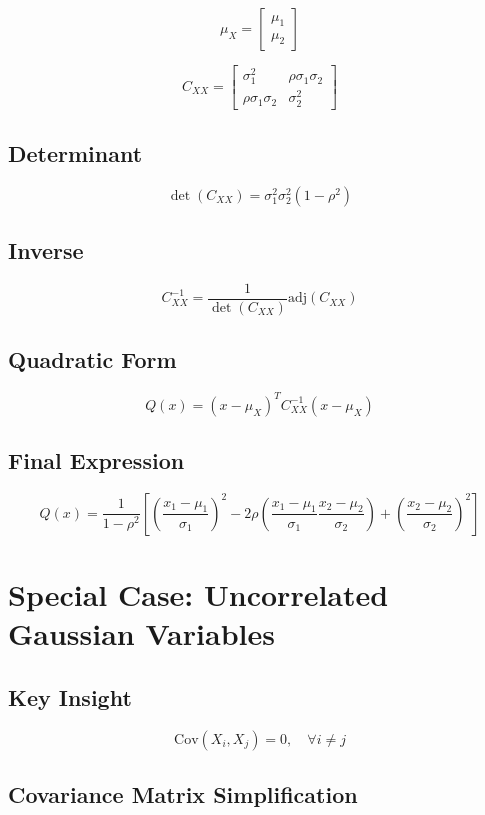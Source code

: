 \documentclass[12pt]{article}
\begin{document}
\[
\mu_X =
\begin{bmatrix}
\mu_1 \\
\mu_2
\end{bmatrix}
\]

\[
C_{XX} =
\begin{bmatrix}
\sigma_1^2 & \rho\sigma_1\sigma_2 \\
\rho\sigma_1\sigma_2 & \sigma_2^2
\end{bmatrix}
\]

\subsection{Determinant}

\[
\det(C_{XX}) = \sigma_1^2 \sigma_2^2 (1 - \rho^2)
\]

\subsection{Inverse}

\[
C_{XX}^{-1} = \frac{1}{\det(C_{XX})} \text{adj}(C_{XX})
\]

\subsection{Quadratic Form}

\[
Q(x) = (x - \mu_X)^T C_{XX}^{-1}(x - \mu_X)
\]

\subsection{Final Expression}

\[
Q(x) =
\frac{1}{1-\rho^2}
\left[
\left(\frac{x_1-\mu_1}{\sigma_1}\right)^2
-2\rho\left(\frac{x_1-\mu_1}{\sigma_1}\frac{x_2-\mu_2}{\sigma_2}\right)
+\left(\frac{x_2-\mu_2}{\sigma_2}\right)^2
\right]
\]

\section{Special Case: Uncorrelated Gaussian Variables}

\subsection{Key Insight}

\[
\text{Cov}(X_i, X_j) = 0, \quad \forall i \neq j
\]

\subsection{Covariance Matrix Simplification}
\end{document}
